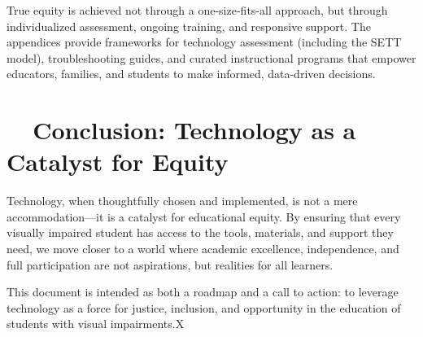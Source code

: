 True equity is achieved not through a one-size-fits-all approach, but through individualized assessment, ongoing training, and responsive support.\supercite{Presley2012, WATIAssessing} The appendices provide frameworks for technology assessment (including the SETT model\supercite{Zabala2005, Hollingshead2020}), troubleshooting guides, and curated instructional programs that empower educators, families, and students to make informed, data-driven decisions.

\section{~~Conclusion: Technology as a Catalyst for Equity}
\label{sec:intro-conclusion}

Technology, when thoughtfully chosen and implemented, is not a mere accommodation—it is a catalyst for educational equity. By ensuring that every visually impaired student has access to the tools, materials, and support they need, we move closer to a world where academic excellence, independence, and full participation are not aspirations, but realities for all learners.

\bigskip

This document is intended as both a roadmap and a call to action: to leverage technology as a force for justice, inclusion, and opportunity in the education of students with visual impairments.\supercite{Warschauer2003TechnologyAndSocialInclusion}X